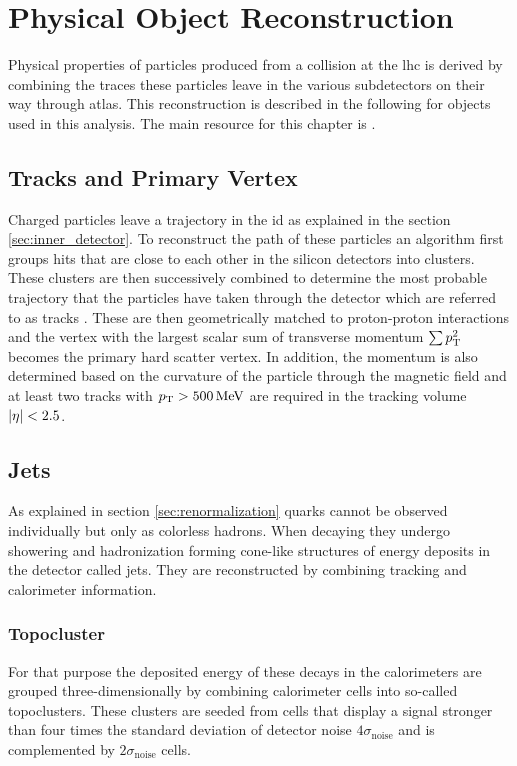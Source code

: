 \chapter{Physical Object Reconstruction}\label{ch:reco}

Physical properties of particles produced from a collision at the \ac{lhc} is derived by combining the traces these particles leave in the various subdetectors on their way through \ac{atlas}. This  reconstruction is described in the following for objects used in this analysis. The main resource for this chapter is \citep{atlas2021optimisation}.

\section{Tracks and Primary Vertex}\label{sec:tracks}
Charged particles leave a trajectory in the \ac{id} as explained in the section \ref{sec:inner_detector}. To reconstruct the path of these particles an algorithm first groups hits that are close to each other in the silicon detectors into clusters. These clusters are then successively combined to determine the most probable trajectory that the particles have taken through the detector which are referred to as tracks \citep{aaboud2017performance}. These are then geometrically matched to proton-proton interactions and the vertex with the largest scalar sum of transverse momentum $\sum p_{\text{T}}^2$ becomes the primary hard scatter vertex. In addition, the momentum is also determined based on the curvature of the particle through the magnetic field and at least two tracks with $p_{\text{T}}>\qty[]{500}{MeV}$ are required in the tracking volume $\left\vert\eta\right\vert<2.5$.

\section{Jets}\label{sec:jets}
As explained in section \ref{sec:renormalization} quarks cannot be observed individually but only as colorless hadrons. When decaying they undergo showering and hadronization forming cone-like structures of energy deposits in the detector called jets. They are reconstructed by combining tracking and calorimeter information.

\subsection{Topocluster}
For that purpose the deposited energy of these decays in the calorimeters are grouped three-dimensionally by combining calorimeter cells into so-called topoclusters. These clusters are seeded from cells that display a signal stronger than four times the standard deviation of detector noise $4\sigma_\mathrm{noise}$ and is complemented by $2\sigma_\mathrm{noise}$ cells.


